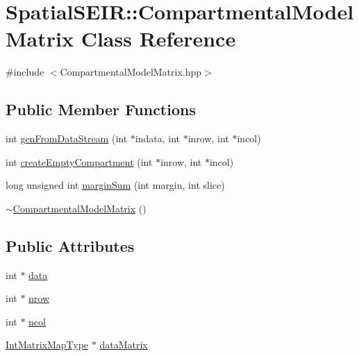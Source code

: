\hypertarget{classSpatialSEIR_1_1CompartmentalModelMatrix}{\section{Spatial\-S\-E\-I\-R\-:\-:Compartmental\-Model\-Matrix Class Reference}
\label{classSpatialSEIR_1_1CompartmentalModelMatrix}
}


{\ttfamily \#include $<$Compartmental\-Model\-Matrix.\-hpp$>$}

\subsection*{Public Member Functions}
\begin{DoxyCompactItemize}
\item 
int \hyperlink{classSpatialSEIR_1_1CompartmentalModelMatrix_a49a4fe227e57abdd57f43b4436f3e087}{gen\-From\-Data\-Stream} (int $\ast$indata, int $\ast$inrow, int $\ast$incol)
\item 
int \hyperlink{classSpatialSEIR_1_1CompartmentalModelMatrix_a813552c2e90f91cb01ede6c06100aff8}{create\-Empty\-Compartment} (int $\ast$inrow, int $\ast$incol)
\item 
long unsigned int \hyperlink{classSpatialSEIR_1_1CompartmentalModelMatrix_a7c9078aef66ee4ef712c542ea9c0e302}{margin\-Sum} (int margin, int slice)
\item 
\hyperlink{classSpatialSEIR_1_1CompartmentalModelMatrix_a5cbbdda0b95f10062d8cd66ba341bbbb}{$\sim$\-Compartmental\-Model\-Matrix} ()
\end{DoxyCompactItemize}
\subsection*{Public Attributes}
\begin{DoxyCompactItemize}
\item 
int $\ast$ \hyperlink{classSpatialSEIR_1_1CompartmentalModelMatrix_a6883dff990309a3f25f769f3d32c3c61}{data}
\item 
int $\ast$ \hyperlink{classSpatialSEIR_1_1CompartmentalModelMatrix_a7b1ff895cb76d4e58423691de0ee2ce3}{nrow}
\item 
int $\ast$ \hyperlink{classSpatialSEIR_1_1CompartmentalModelMatrix_a7993fa87c9a14c96e0462bd11d075d00}{ncol}
\item 
\hyperlink{namespaceSpatialSEIR_aef5eeacdd778eee57264f9ca171dd505}{Int\-Matrix\-Map\-Type} $\ast$ \hyperlink{classSpatialSEIR_1_1CompartmentalModelMatrix_a884b555fc3a19cc9a79f4780340ef1ba}{data\-Matrix}
\end{DoxyCompactItemize}


